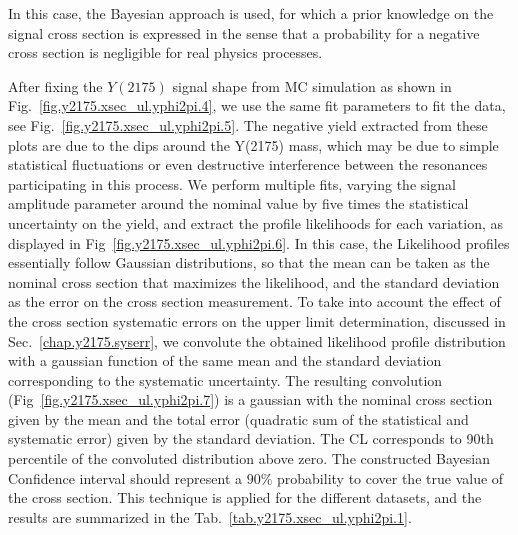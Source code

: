 \noindent In this case, the Bayesian approach is used, for which a prior knowledge on the signal cross section is expressed in the sense that a probability for a negative cross section is negligible for real physics processes.
~\par After fixing the $Y(2175)$ signal shape from MC simulation as shown in Fig.~\ref{fig.y2175.xsec_ul.yphi2pi.4}, we use the same fit parameters to fit the data, see Fig.~\ref{fig.y2175.xsec_ul.yphi2pi.5}. The negative yield extracted from these plots are due to the dips around the Y(2175) mass, which may be due to simple statistical fluctuations or even destructive interference between the resonances participating in this process. We perform multiple fits, varying the signal amplitude parameter around the nominal value by five times the statistical uncertainty on the yield, and extract the profile likelihoods for each variation, as displayed in Fig~\ref{fig.y2175.xsec_ul.yphi2pi.6}. In this case, the Likelihood profiles essentially follow Gaussian distributions, so that the mean can be taken as the nominal cross section that maximizes the likelihood, and the standard deviation as the error on the cross section measurement. To take into account the effect of the cross section systematic errors on the upper limit determination, discussed in Sec.~\ref{chap.y2175.syserr}, we convolute the obtained likelihood profile distribution with a gaussian function of the same mean and the standard deviation corresponding to the systematic uncertainty. The resulting convolution (Fig~\ref{fig.y2175.xsec_ul.yphi2pi.7}) is a gaussian with the nominal cross section given by the mean and the total error (quadratic sum of the statistical and systematic error) given by the standard deviation. The CL corresponds to 90th percentile of the convoluted distribution above zero. The constructed Bayesian Confidence interval should represent a $90\%$ probability to cover the true value of the cross section. This technique is applied for the different datasets, and the results are summarized in the Tab.~\ref{tab.y2175.xsec_ul.yphi2pi.1}.

